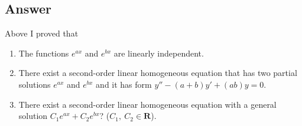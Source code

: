 \subsection*{Answer}

Above I proved that 
\begin{enumerate}[label=\alph*]
    \item The functions $e^{ax}$ and $e^{bx}$ are linearly independent.
    \item There exist a second-order linear homogeneous equation that has two partial solutions $e^{ax}$ and $e^{bx}$ and it has form $y'' - (a + b)y' + (ab)y = 0$.
    \item There exist a second-order linear homogeneous equation with a general solution $C_1 e^{ax} + C_2 e^{bx}$? ($C_1,\ C_2 \in \mathbf{R}$).
\end{enumerate}
